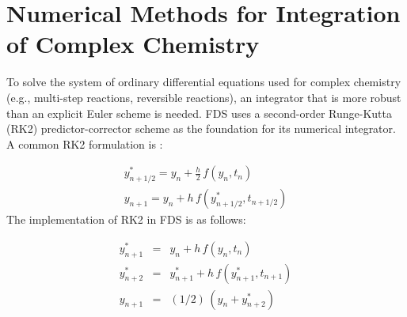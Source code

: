 \chapter{Numerical Methods for Integration of Complex Chemistry}

\label{chemistry_integration}

To solve the system of ordinary differential equations used for complex chemistry (e.g., multi-step reactions, reversible reactions), an integrator that is more robust than an explicit Euler scheme is needed. FDS uses a second-order Runge-Kutta (RK2) predictor-corrector scheme as the foundation for its numerical integrator. A common RK2 formulation is \cite{Moin:2001}:

\begin{eqnarray}\label{RK2_moin}
y^*_{n+1/2}=y_n+\frac{h}{2}\,f(y_{n},t_{n}) \\
\nonumber y_{n+1}=y_{n}+h\,f(y^*_{n+1/2},t_{n+1/2})
\end{eqnarray}
The implementation of RK2 in FDS is as follows:

\begin{eqnarray}\label{RK2}
y^*_{n+1}           &=& y_n+h\,f(y_{n},t_{n}) \\
\nonumber y^*_{n+2} &=& y^*_{n+1}+h\,f(y^*_{n+1},t_{n+1}) \\
\nonumber y_{n+1} &=& (1/2)\,(y_{n}+y^*_{n+2})
\end{eqnarray}

